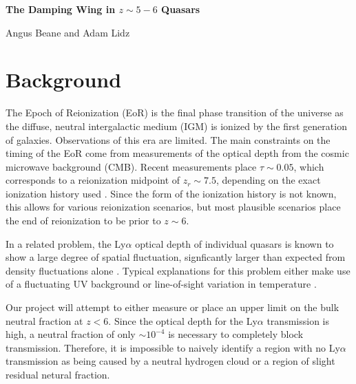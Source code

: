 \documentclass[11pt,letterpaper]{article}
\begin{document}
\thispagestyle{firstpage}%
\ifdefined\dark
    \pagecolor{bggrey}
    \color{white}
\fi

\def\parskipdefault{\parskip}
\setlength{\parskip}{1.2ex}

\def\parindentdefault{\parindent}
\setlength{\parindent}{0pt}

\textbf{The Damping Wing in $z\sim5-6$ Quasars}

Angus Beane and Adam Lidz


\deemph{\today}

\section{Background}
The Epoch of Reionization (EoR) is the final phase transition of the universe
as the diffuse, neutral intergalactic medium (IGM) is ionized by the first
generation of galaxies. Observations of this era are limited. The main
constraints on the timing of the EoR come from measurements of the optical
depth from the cosmic microwave background (CMB). Recent measurements place
$\tau \sim 0.05$, which corresponds to a reionization midpoint of $z_r \sim
7.5$, depending on the exact ionization history used
\citep{2018arXiv180706209P}. Since the form of the ionization history is not
known, this allows for various reionization scenarios, but most plausible
scenarios place the end of reionization to be prior to $z\sim6$.

In a related problem, the Ly$\alpha$ optical depth of individual quasars is
known to show a large degree of spatial fluctuation, signficantly larger than
expected from density fluctuations alone \citep[e.g.][]{2015PASA...32...45B}.
Typical explanations for this problem either make use of a fluctuating UV
background \citep{2017MNRAS.465.3429C} or line-of-sight variation in
temperature \citep{2015ApJ...813L..38D}.

Our project will attempt to either measure or place an upper limit on the bulk
neutral fraction at $z<6$. Since the optical depth for the Ly$\alpha$
transmission is high, a neutral fraction of only $\sim10^{-4}$ is necessary to
completely block transmission. Therefore, it is impossible to naively identify
a region with no Ly$\alpha$ transmission as being caused by a neutral hydrogen
cloud or a region of slight residual netural fraction.
\end{document}
